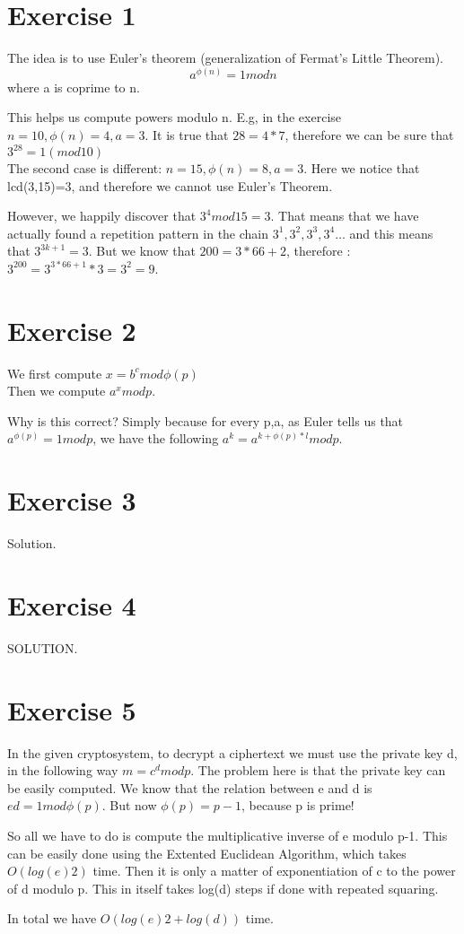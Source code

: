 \section*{Exercise 1}
The idea is to use Euler's theorem (generalization of Fermat's Little Theorem).
\[ a^{\phi(n)} = 1 mod n \] where a is coprime to n. 

This helps us compute powers modulo n. E.g, in the exercise $n=10, \phi(n) =4, a=3$. It is true that $28=4*7$, therefore we can be sure that $3^{28}=1 (mod10)$
\\

The second case is different: $n=15, \phi(n)=8, a=3$. Here we notice that lcd(3,15)=3, and therefore we cannot use Euler's Theorem.

However, we happily discover that $3^4 mod 15 = 3$. That means that we have actually found a repetition pattern in the chain 
$3^1,3^2,3^3,3^4\ldots $ and this means that $3^{3k+1}=3$. But we know that $200= 3*66+2$, therefore : $3^{200}=3^{3*66+1}*3=3^2=9$.

\section*{Exercise 2}

We first compute $x=b^c mod \phi(p)$ \\
Then we compute  $a^x mod p$. 

Why is this correct? Simply because for every p,a, as Euler tells us that$a^{\phi(p)}=1 mod p$, we have the following $ a^k = a^{k+\phi(p)*l} mod p $.


\section*{Exercise 3}
Solution.
\section*{Exercise 4}
SOLUTION.
\section*{Exercise 5}

In the given cryptosystem, to decrypt a ciphertext we must use the private key d, in the following way $m = c^d mod p$. The problem here is that the private key can be easily computed. We know that the relation between e and d is $ed = 1 mod \phi(p)$.
But now $\phi(p)=p-1$, because p is prime! 

So all we have to do is compute the multiplicative inverse of e modulo p-1. This can be easily done using the Extented Euclidean Algorithm, which takes $O(log(e)2)$ time. Then it is only a matter of exponentiation of c to the power of d modulo p. This in itself takes log(d) steps if done with repeated squaring. 

In total we have $O(log(e)2+log(d))$ time.



